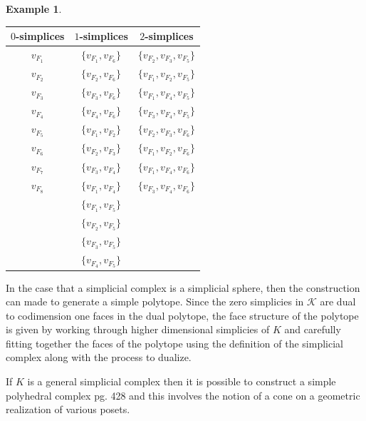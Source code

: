 \documentclass[oneside,12pt]{amsart}
\theoremstyle{definition}
\newtheorem{Example}[Theorem]{Example}
\numberwithin{equation}{section}
\begin{document}
\begin{Example}
\begin{center}
\begin{tabular}{|c|c|c|}
\hline
$0$-simplices&$1$-simplices&$2$-simplices\\ \hline
$v_{F_1}$ & $\{v_{F_1}, v_{F_6}\}$   &  $\{v_{F_2}, v_{F_3}, v_{F_5}\}$ \\
$v_{F_2}$ &  $\{v_{F_2}, v_{F_6}\}$  &  $\{v_{F_1}, v_{F_2}, v_{F_5}\}$             \\
$v_{F_3}$ &  $\{v_{F_3}, v_{F_6}\}$  &  $\{v_{F_1}, v_{F_4}, v_{F_5}\}$           \\
$v_{F_4}$ &   $\{v_{F_4}, v_{F_6}\}$ &  $\{v_{F_3}, v_{F_4}, v_{F_5}\}$            \\
$v_{F_5}$ &   $\{v_{F_1}, v_{F_2}\}$ &   $\{v_{F_2}, v_{F_3}, v_{F_6}\}$          \\
$v_{F_6}$ & $\{v_{F_2}, v_{F_3}\}$   &  $\{v_{F_1}, v_{F_2}, v_{F_6}\}$              \\
$v_{F_7}$ & $\{v_{F_3}, v_{F_4}\}$   &  $\{v_{F_1}, v_{F_4}, v_{F_6}\}$               \\
$v_{F_8}$ & $\{v_{F_1}, v_{F_4}\}$   &   $\{v_{F_3}, v_{F_4}, v_{F_6}\}$              \\
          & $\{v_{F_1}, v_{F_5}\}$   &                   \\
          & $\{v_{F_2}, v_{F_5}\}$   &                   \\
          &  $\{v_{F_3}, v_{F_5}\}$  &                   \\
          &  $\{v_{F_4}, v_{F_5}\}$  &                  \\
\hline
\end{tabular}
\end{center}



\vspace{.1in}
\end{Example}

In the case that a simplicial complex is a simplicial sphere, then the construction can made to generate a simple polytope.  Since the zero simplicies in $\mathcal{K}$ are dual to codimension one faces in the dual polytope, the face structure of the polytope is given by working through higher dimensional simplicies of $K$ and carefully fitting together the faces of the polytope using the definition of the simplicial complex along with the process to dualize.

If $K$ is a general simplicial complex then it is possible to construct a simple polyhedral complex \cite{DJ} pg. 428 and this involves the notion of a cone on a geometric realization of various posets.
\end{document}

